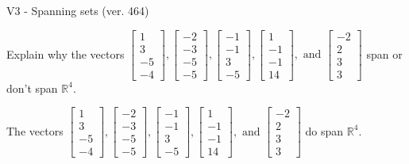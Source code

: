 \begin{exercise}
  \begin{exerciseTitle}V3 - Spanning sets (ver. 464)\end{exerciseTitle}
  \begin{exerciseStatement}
    Explain why the vectors \(\left[\begin{array}{r}
1 \\
3 \\
-5 \\
-4
\end{array}\right] , \left[\begin{array}{r}
-2 \\
-3 \\
-5 \\
-5
\end{array}\right] , \left[\begin{array}{r}
-1 \\
-1 \\
3 \\
-5
\end{array}\right] , \left[\begin{array}{r}
1 \\
-1 \\
-1 \\
14
\end{array}\right] , \text{ and } \left[\begin{array}{r}
-2 \\
2 \\
3 \\
3
\end{array}\right]\) span or don't span \(\mathbb{R}^4\). 
	


  \end{exerciseStatement}
  \begin{exerciseAnswer}
   The vectors \(\left[\begin{array}{r}
1 \\
3 \\
-5 \\
-4
\end{array}\right] , \left[\begin{array}{r}
-2 \\
-3 \\
-5 \\
-5
\end{array}\right] , \left[\begin{array}{r}
-1 \\
-1 \\
3 \\
-5
\end{array}\right] , \left[\begin{array}{r}
1 \\
-1 \\
-1 \\
14
\end{array}\right] , \text{ and } \left[\begin{array}{r}
-2 \\
2 \\
3 \\
3
\end{array}\right]\) 
  	 do  
	span \(\mathbb{R}^4\).
  



\end{exerciseAnswer}
\end{exercise}

